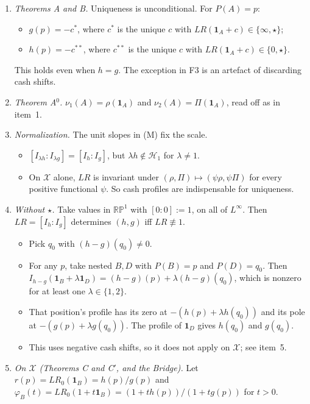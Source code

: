 \begin{proposition}[Uniqueness]
\begin{enumerate}
\item \emph{Theorems A and B.} Uniqueness is unconditional. For $P(A)=p$:
  \begin{itemize}
  \item $g(p)=-c^*$, where $c^*$ is the unique $c$ with $LR(\mathbf 1_A+c)\in\{\infty,\star\}$;
  \item $h(p)=-c^{**}$, where $c^{**}$ is the unique $c$ with $LR(\mathbf 1_A+c)\in\{0,\star\}$.
  \end{itemize}
  This holds even when $h=g$. The exception in F3 is an artefact of discarding cash shifts.
\item \emph{Theorem A$^0$.} $\nu_1(A)=\rho(\mathbf 1_A)$ and $\nu_2(A)=\Pi(\mathbf 1_A)$, read off as in item~1.
\item \emph{Normalization.} The unit slopes in (M) fix the scale.
  \begin{itemize}
  \item $[I_{\lambda h}:I_{\lambda g}]=[I_h:I_g]$, but $\lambda h\notin\mathcal H_1$ for $\lambda\neq1$.
  \item On $\mathcal X$ alone, $LR$ is invariant under $(\rho,\Pi)\mapsto(\psi\rho,\psi\Pi)$ for every positive functional $\psi$. So cash profiles are indispensable for uniqueness.
  \end{itemize}
\item \emph{Without $\star$.} Take values in $\mathbb{RP}^1$ with $[0:0]:=1$, on all of $L^\infty$. Then $LR=[I_h:I_g]$ determines $(h,g)$ iff $LR\not\equiv1$.
  \begin{itemize}
  \item Pick $q_0$ with $(h-g)(q_0)\neq0$.
  \item For any $p$, take nested $B,D$ with $P(B)=p$ and $P(D)=q_0$. Then $I_{h-g}(\mathbf 1_B+\lambda\mathbf 1_D)=(h-g)(p)+\lambda(h-g)(q_0)$, which is nonzero for at least one $\lambda\in\{1,2\}$.
  \item That position's profile has its zero at $-(h(p)+\lambda h(q_0))$ and its pole at $-(g(p)+\lambda g(q_0))$. The profile of $\mathbf 1_D$ gives $h(q_0)$ and $g(q_0)$.
  \item This uses negative cash shifts, so it does not apply on $\mathcal X$; see item~5.
  \end{itemize}
\item \emph{On $\mathcal X$ (Theorems C and C$'$, and the Bridge).} Let $r(p)=LR_0(\mathbf 1_B)=h(p)/g(p)$ and $\varphi_B(t)=LR_0(1+t\mathbf 1_B)=(1+th(p))/(1+tg(p))$ for $t>0$.

\end{enumerate}
\end{proposition}
